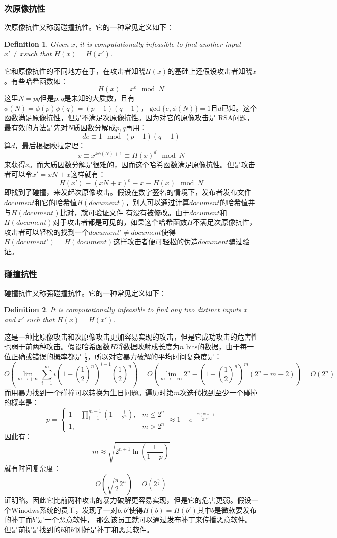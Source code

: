 \documentclass[UTF8, a4paper, 11pt]{article}
\newtheorem{myDef}{Definition}
\begin{document}
\subsubsection{次原像抗性}
次原像抗性又称弱碰撞抗性。它的一种常见定义如下：
\begin{myDef}
    Given $x$, it is computationally infeasible to find another input $x'\ne x$such that $H(x)=H(x')$.
\end{myDef}
它和原像抗性的不同地方在于，在攻击者知晓$H(x)$的基础上还假设攻击者知晓$x$。有些哈希函数如：
$$H(x)=x^e\mod{N}$$
这里$N=pq$但是$p,q$是未知的大质数，且有$\phi(N)=\phi(p)\phi(q)=(p-1)(q-1)$，$\gcd\{e,\phi(N)\}=1$且$d$已知。这个函数满足原像抗性，但是不满足次原像抗性。因为对它的原像攻击是
RSA问题，最有效的方法是先对$N$质因数分解成$p,q$再用：
$$de\equiv1\mod{(p-1)(q-1)}$$
算$d$，最后根据欧拉定理：
$$x\equiv x^{k\phi(N)+1}\equiv H(x)^d\mod{N}$$
来获得$x$。而大质因数分解是很难的，因而这个哈希函数满足原像抗性。但是攻击者可以令$x'=xN+x$这样就有：
$$H(x')\equiv(xN+x)^e\equiv x\equiv H(x)\mod{N}$$
即找到了碰撞，来发起次原像攻击。假设在数字签名的情境下，发布者发布文件$document$和它的哈希值$H(document)$，别人可以通过计算$document$的哈希值并与$H(document)$比对，就可验证文件
有没有被修改。由于$document$和$H(document)$对于攻击者都是可见的，如果这个哈希函数$H$不满足次原像抗性，攻击者可以轻松的找到一个$document'\ne document$使得
$H(document')=H(document)$这样攻击者便可轻松的伪造$document$骗过验证。
\subsubsection{碰撞抗性}
碰撞抗性又称强碰撞抗性。它的一种常见定义如下：
\begin{myDef}
    It is computationally infeasible to find any two distinct inputs $x$ and $x'$ such that $H(x)=H(x')$.
\end{myDef}
这是一种比原像攻击和次原像攻击更加容易实现的攻击，但是它成功攻击的危害性也弱于前两种攻击。假设哈希函数$H$将数据映射成长度为$n\text{ bits}$的数据，由于每一位正确或错误的概率都是
$\frac12$，所以对它暴力破解的平均时间复杂度是：
$$O(\lim_{m\rightarrow+\infty}\sum_{i=1}^mi(1-(\frac12)^n)^{i-1}(\frac12)^n)=O(\lim_{m\rightarrow+\infty}2^n-(1-(\frac12)^n)^m(2^n-m-2))=O(2^n)$$
而用暴力找到一个碰撞可以转换为生日问题。遍历时第$m$次迭代找到至少一个碰撞的概率是：
$$
    p=
    \begin{cases}
        1-\prod_{i=1}^{m-1}(1-\frac i{2^n}), & m\le2^n \\
        1,                                   & m>2^n
    \end{cases}
    \approx1-e^{-\frac{m(m-1)}{2^{n+1}}}
$$
因此有：
$$m\approx\sqrt{2^{n+1}\ln(\frac1{1-p})}$$
就有时间复杂度：
$$O(\sqrt{\frac\pi2 2^n})=O(2^{\frac n2})$$
证明略。因此它比前两种攻击的暴力破解更容易实现，但是它的危害更弱。假设一个Winodws系统的员工，发现了一对$b,b'$使得$H(b)=H(b')$其中$b$是微软要发布的补丁而$b'$是一个恶意软件，
那么该员工就可以通过发布补丁来传播恶意软件。但是前提是找到的$b$和$b'$刚好是补丁和恶意软件。
\end{document}

